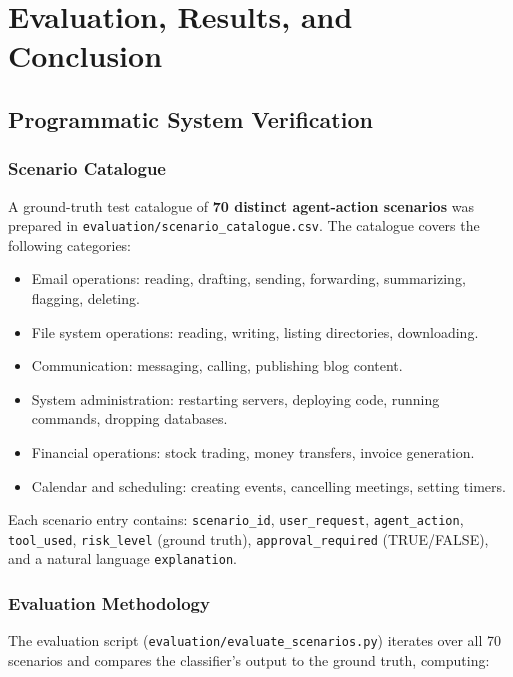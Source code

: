 \chapter{Evaluation, Results, and Conclusion}

\section{Programmatic System Verification}

\subsection{Scenario Catalogue}

A ground-truth test catalogue of \textbf{70 distinct agent-action scenarios} was prepared in \texttt{evaluation/scenario\_catalogue.csv}. The catalogue covers the following categories:

\begin{itemize}[leftmargin=1.5em]
  \item Email operations: reading, drafting, sending, forwarding, summarizing, flagging, deleting.
  \item File system operations: reading, writing, listing directories, downloading.
  \item Communication: messaging, calling, publishing blog content.
  \item System administration: restarting servers, deploying code, running commands, dropping databases.
  \item Financial operations: stock trading, money transfers, invoice generation.
  \item Calendar and scheduling: creating events, cancelling meetings, setting timers.
\end{itemize}

Each scenario entry contains: \texttt{scenario\_id}, \texttt{user\_request}, \texttt{agent\_action}, \texttt{tool\_used}, \texttt{risk\_level} (ground truth), \texttt{approval\_required} (TRUE/FALSE), and a natural language \texttt{explanation}.

\subsection{Evaluation Methodology}

The evaluation script (\texttt{evaluation/evaluate\_scenarios.py}) iterates over all 70 scenarios and compares the classifier's output to the ground truth, computing:

